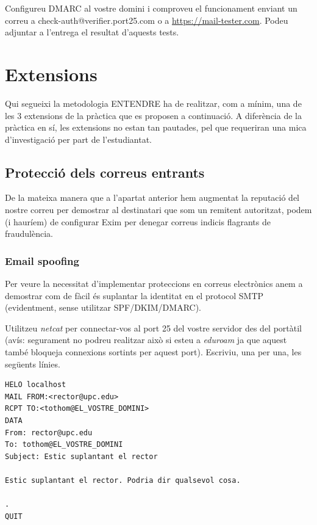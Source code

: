 \documentclass{practicaitic}
\begin{document}
\begin{tasca}
  Configureu DMARC al vostre domini i comproveu el funcionament enviant
  un correu a check-auth@verifier.port25.com o a \url{https://mail-tester.com}.
  Podeu adjuntar a l'entrega el resultat d'aquests tests.
\end{tasca}

\section{Extensions}

Qui segueixi la metodologia ENTENDRE ha de realitzar, com a mínim, una de les 3
extensions de la pràctica que es proposen a continuació.
A diferència de la pràctica en sí, les extensions no estan tan pautades, pel
que requeriran una mica d'investigació per part de l'estudiantat.

\subsection{Protecció dels correus entrants}

De la mateixa manera que a l'apartat anterior hem augmentat la reputació
del nostre correu per demostrar al destinatari que som un remitent autoritzat,
podem (i hauríem) de configurar Exim per denegar correus indicis flagrants de
fraudulència.

\subsubsection{Email spoofing}

Per veure la necessitat d'implementar proteccions en correus electrònics
anem a demostrar com de fàcil és suplantar la identitat en el protocol SMTP
(evidentment, sense utilitzar SPF/DKIM/DMARC).

\begin{tasca}
Utilitzeu \textit{netcat} per connectar-vos al port 25 del vostre servidor des
del portàtil (avís: segurament no podreu realitzar això si esteu a
\textit{eduroam} ja que aquest també bloqueja connexions sortints per aquest
port). Escriviu, una per una, les següents línies.
\end{tasca}

\begin{tcolorbox}[
  colback=gray!10, colframe=gray!50,
  rounded corners
]
\begin{verbatim}
HELO localhost
MAIL FROM:<rector@upc.edu>
RCPT TO:<tothom@EL_VOSTRE_DOMINI>
DATA
From: rector@upc.edu
To: tothom@EL_VOSTRE_DOMINI
Subject: Estic suplantant el rector

Estic suplantant el rector. Podria dir qualsevol cosa.

.
QUIT
\end{verbatim}
\end{tcolorbox}
\end{document}
